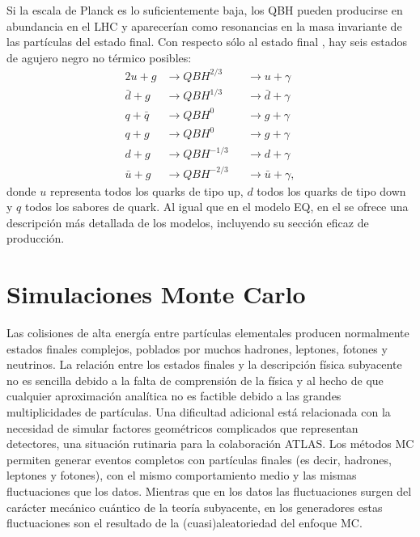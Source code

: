 Si la escala de Planck es lo suficientemente baja, los \ac{QBH} pueden producirse en abundancia en el \ac{LHC} y aparecerían como resonancias en la masa invariante de las partículas del estado final. Con respecto sólo al estado final \gammajet, hay seis estados de agujero negro no térmico posibles:
\begin{alignat*}{2}
    u + g       & \to QBH^{2/3}     && \to u + \gamma\\
    \bar{d} + g & \to QBH^{1/3}     && \to \bar{d} + \gamma\\
    q + \bar{q} & \to QBH^{0}       && \to g + \gamma\\
    q + g       & \to QBH^{0}       && \to g + \gamma\\
    d + g       & \to QBH^{-1/3}    && \to d + \gamma\\
    \bar{u} + g & \to QBH^{-2/3}    && \to \bar{u} + \gamma,
\end{alignat*}
donde \(u\) representa todos los quarks de tipo up, \(d\) todos los quarks de tipo down y \(q\) todos los sabores de quark. Al igual que en el modelo \ac{EQ}, en el \Ch{\ref{ch:samples}} se ofrece una descripción más detallada de los modelos, incluyendo su sección eficaz de producción.












\section{Simulaciones Monte Carlo}
\label{sec:theory:mc_simulation}


Las colisiones de alta energía entre partículas elementales producen normalmente estados finales complejos, poblados por muchos hadrones, leptones, fotones y neutrinos. La relación entre los estados finales y la descripción física subyacente no es sencilla debido a la falta de comprensión de la física y al hecho de que cualquier aproximación analítica no es factible debido a las grandes multiplicidades de partículas. Una dificultad adicional está relacionada con la necesidad de simular factores geométricos complicados que representan detectores, una situación rutinaria para la colaboración \ac{ATLAS}.
Los métodos \acf{MC} permiten generar eventos completos con partículas finales (es decir, hadrones, leptones y fotones), con el mismo comportamiento medio y las mismas fluctuaciones que los datos. Mientras que en los datos las fluctuaciones surgen del carácter mecánico cuántico de la teoría subyacente, en los generadores estas fluctuaciones son el resultado de la (cuasi)aleatoriedad del enfoque \ac{MC}.

